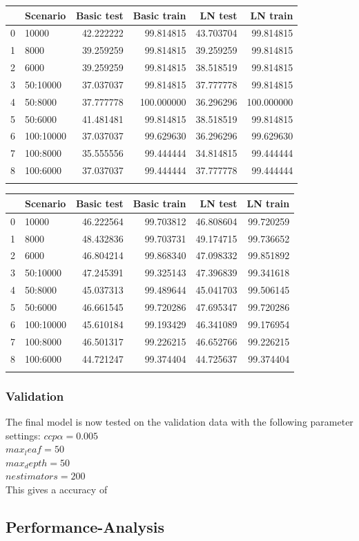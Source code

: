 \documentclass[11pt]{article}
\begin{document}
%
\newline
\begin{tabular}{llrrrr}
\toprule
{} &   Scenario &  Basic test &  Basic train &    LN test &    LN train \\
\midrule
0 &      10000 &   42.222222 &    99.814815 &  43.703704 &   99.814815 \\
1 &       8000 &   39.259259 &    99.814815 &  39.259259 &   99.814815 \\
2 &       6000 &   39.259259 &    99.814815 &  38.518519 &   99.814815 \\
3 &   50:10000 &   37.037037 &    99.814815 &  37.777778 &   99.814815 \\
4 &    50:8000 &   37.777778 &   100.000000 &  36.296296 &  100.000000 \\
5 &    50:6000 &   41.481481 &    99.814815 &  38.518519 &   99.814815 \\
6 &  100:10000 &   37.037037 &    99.629630 &  36.296296 &   99.629630 \\
7 &   100:8000 &   35.555556 &    99.444444 &  34.814815 &   99.444444 \\
8 &   100:6000 &   37.037037 &    99.444444 &  37.777778 &   99.444444 \\
\bottomrule
\label{Random forest hold out}
\end{tabular}
\newline
\begin{tabular}{llrrrr}
\toprule
{} &   Scenario &  Basic test &  Basic train &    LN test &   LN train \\
\midrule
0 &      10000 &   46.222564 &    99.703812 &  46.808604 &  99.720259 \\
1 &       8000 &   48.432836 &    99.703731 &  49.174715 &  99.736652 \\
2 &       6000 &   46.804214 &    99.868340 &  47.098332 &  99.851892 \\
3 &   50:10000 &   47.245391 &    99.325143 &  47.396839 &  99.341618 \\
4 &    50:8000 &   45.037313 &    99.489644 &  45.041703 &  99.506145 \\
5 &    50:6000 &   46.661545 &    99.720286 &  47.695347 &  99.720286 \\
6 &  100:10000 &   45.610184 &    99.193429 &  46.341089 &  99.176954 \\
7 &   100:8000 &   46.501317 &    99.226215 &  46.652766 &  99.226215 \\
8 &   100:6000 &   44.721247 &    99.374404 &  44.725637 &  99.374404 \\
\bottomrule
\label{Random forest cross validation}
\end{tabular}
\subsubsection{Validation}
The final model is now tested on the validation data with the following parameter settings:
$ccp \alpha = 0.005$ \\
$max_leaf = 50$ \\
$max_depth = 50$ \\
$n estimators = 200$ \\ 
This gives a accuracy of 
 
 \subsection{Performance-Analysis}
\end{document}
